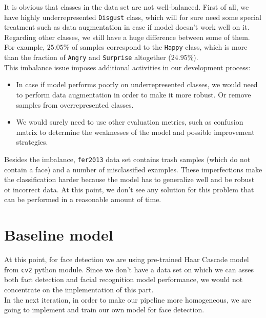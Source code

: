 It is obvious that classes in the data set are not well-balanced. First of all, we have highly underrepresented \texttt{Disgust} class, which will for sure need some special treatment such as data augmentation in case if model doesn't work well on it.\\

Regarding other classes, we still have a huge difference between some of them. For example, $25.05\%$ of samples correspond to the \texttt{Happy} class, which is more than the fraction of \texttt{Angry} and \texttt{Surprise} altogether ($24.95\%$).\\ 

This imbalance issue imposes additional activities in our development process:

\begin{itemize}
	\item 
	In case if model performs poorly on underrepresented classes, we would need to perform data augmentation in order to make it more robust. Or remove samples from overrepresented classes.
	\item
	We would surely need to use other evaluation metrics, such as confusion matrix to determine the weaknesses of the model and possible improvement strategies.
\end{itemize}

Besides the imbalance, \texttt{fer2013} data set contains trash samples (which do not contain a face) and a number of misclassified examples. These imperfections make the classification harder because the model has to generalize well and be robust ot incorrect data. At this point, we don't see any solution for this problem that can be performed in a reasonable amount of time.

\section{Baseline model}

At this point, for face detection we are using pre-trained Haar Cascade model from \texttt{cv2} python module. Since we don't have a data set on which we can asses both fact detection and facial recognition model performance, we would not concentrate on the implementation of this part.\\

In the next iteration, in order to make our pipeline more homogeneous, we are going to implement and train our own model for face detection.\\

